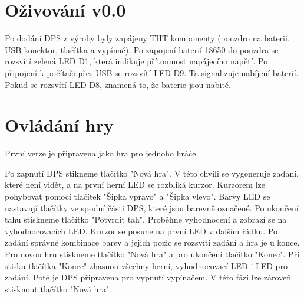 \chapter{Oživování v0.0}
Po dodání DPS z výroby byly zapájeny THT komponenty (pouzdro na baterii, USB konektor, tlačítka a vypínač). Po zapojení baterií
18650 do pouzdra se rozsvítí zelená LED D1, která indikuje přítomnost napájecího napětí. Po připojení k počítači přes USB
se rozsvítí LED D9. Ta signalizuje nabíjení baterií. Pokud se rozsvítí LED D8, znamená to, že baterie jsou nabité.


\chapter{Ovládání hry}
První verze je připravena jako hra pro jednoho hráče.

Po zapnutí DPS stikneme tlačítko "Nová hra". V této chvíli se vygeneruje zadání, které není vidět,
 a na první herní LED se rozbliká kurzor. 
Kurzorem lze pohybovat pomocí tlačítek "Šipka vpravo" a "Šipka vlevo". Barvy LED se nastavují tlačítky ve spodní části DPS,
které jsou barevně označené. 
Po ukončení tahu stiskneme tlačítko "Potvrdit tah". Proběhne vyhodnocení a zobrazí se na vyhodnocovacích LED. Kurzor se posune
na první LED v dalším řádku.
Po zadání správné kombinace barev a jejich pozic se rozsvítí zadání a hra je u konce. Pro novou hru stiskneme tlačítko
"Nová hra" a pro ukončení tlačítko "Konec".
Při stisku tlačítka "Konec" zhasnou všechny herní, vyhodnocovací LED i LED pro zadání. Poté je DPS připravena pro vypnutí
vypínačem. V této fázi lze zároveň stisknout tlačítko "Nová hra".